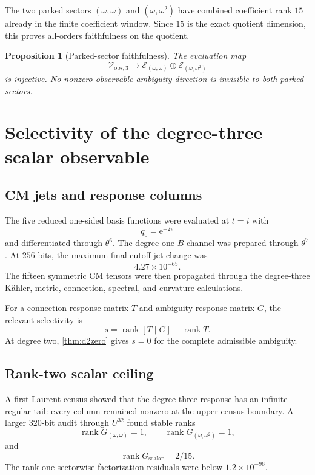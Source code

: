 \documentclass[11pt]{article}
\newtheorem{proposition}[theorem]{Proposition}
\theoremstyle{definition}
\theoremstyle{remark}
\newcommand{\e}{\mathrm{e}}
\newcommand{\cV}{\mathcal{V}}
\newcommand{\cE}{\mathcal{E}}
\newcommand{\rank}{\operatorname{rank}}
\begin{document}
The two parked sectors $(\omega,\omega)$ and $(\omega,\omega^2)$ have combined coefficient rank $15$ already in the finite coefficient window.  Since $15$ is the exact quotient dimension, this proves all-orders faithfulness on the quotient.

\begin{proposition}[Parked-sector faithfulness]\label{prop:faithful}
The evaluation map
\[
\cV_{\mathrm{obs},3}
\longrightarrow
\cE_{(\omega,\omega)}\oplus\cE_{(\omega,\omega^2)}
\]
is injective.  No nonzero observable ambiguity direction is invisible to both parked sectors.
\end{proposition}

\section{Selectivity of the degree-three scalar observable}

\subsection{CM jets and response columns}

The five reduced one-sided basis functions were evaluated at $t=i$ with
\[
q_0=\e^{-2\pi}
\]
and differentiated through $\theta^6$.  The degree-one $B$ channel was prepared through $\theta^7$.  At $256$ bits, the maximum final-cutoff jet change was
\[
4.27\times10^{-65}.
\]
The fifteen symmetric CM tensors were then propagated through the degree-three K\"ahler, metric, connection, spectral, and curvature calculations.

For a connection-response matrix $T$ and ambiguity-response matrix $G$, the relevant selectivity is
\begin{equation}\label{eq:selectivity}
s=\rank[T\mid G]-\rank T.
\end{equation}
At degree two, \cref{thm:d2zero} gives $s=0$ for the complete admissible ambiguity.

\subsection{Rank-two scalar ceiling}

A first Laurent census showed that the degree-three response has an infinite regular tail: every column remained nonzero at the upper census boundary.  A larger $320$-bit audit through $U^{32}$ found stable ranks
\[
\rank G_{(\omega,\omega)}=1,
\qquad
\rank G_{(\omega,\omega^2)}=1,
\]
and
\begin{equation}\label{eq:rank2}
\rank G_{\mathrm{scalar}}=2/15.
\end{equation}
The rank-one sectorwise factorization residuals were below $1.2\times10^{-96}$.
\end{document}
